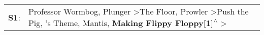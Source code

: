 \begin{supertabular}{p{0.03\textwidth}p{0.92\textwidth}}
 \textbf{S1}:  &  Professor Wormbog\textsuperscript{}, \enspace Plunger\textsuperscript{} \textgreater \enspace The Floor\textsuperscript{}, \enspace Prowler\textsuperscript{} \textgreater \enspace Push the Pig\textsuperscript{}, 's Theme\textsuperscript{}, \enspace Mantis\textsuperscript{}, \enspace \textbf{Making Flippy Floppy[1]\textsuperscript{$\wedge$}} \textgreater {}\textsuperscript{}  \enspace  \\
\end{supertabular}

